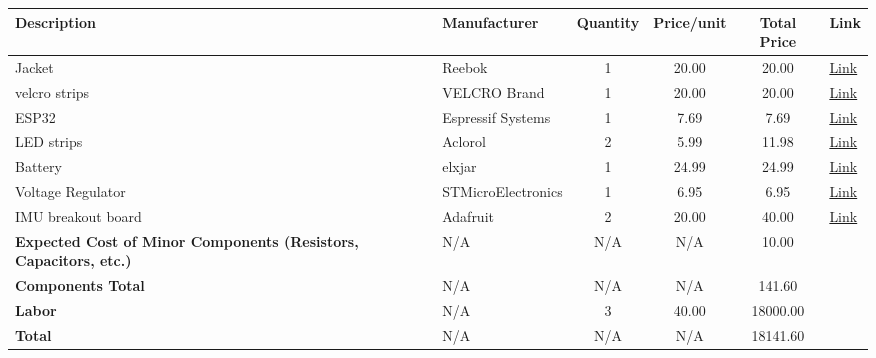 \documentclass[12pt]{article}
\begin{document}
\begin{table}[htbp]
    \centering
    \begin{tabular}{@{} l l S[table-format=1.0] S[table-format=2.2] S[table-format=5.2] l @{}}
    \toprule
    \textbf{Description} & \textbf{Manufacturer} & {\textbf{Quantity}} & {\textbf{Price/unit}} & {\textbf{Total Price}} & {\textbf{Link}} \\
    \midrule
    Jacket              & Reebok               & 1                  & 20.00               & 20.00               & \href{https://www.walmart.com/ip/Reebok-Men-s-Hooded-Sweater-Fleece-Jacket-Sizes-M-2XL/3638204782}{Link} \\
    velcro strips       & VELCRO Brand         & 1                  & 20.00               & 20.00               & \href{https://tinyurl.com/96a2mzmp}{Link} \\
    ESP32               & Espressif Systems    & 1                  & 7.69                & 7.69                & \href{https://tinyurl.com/53m9m6st}{Link} \\
    LED strips          & Aclorol              & 2                  & 5.99                & 11.98               & \href{https://tinyurl.com/bdjy37u6}{Link} \\
    Battery             & elxjar               & 1                  & 24.99               & 24.99               & \href{https://tinyurl.com/3edpx9py}{Link} \\
    Voltage Regulator   & STMicroElectronics   & 1                  & 6.95                & 6.95                & \href{https://pmdway.com/products/lm317-1-2-37v-1-5a-to-220-adjustable-linear-voltage-regulator-10-pack}{Link} \\
    IMU breakout board  & Adafruit             & 2                  & 20.00               & 40.00               & \href{https://tinyurl.com/3r7yceb9}{Link} \\
    \addlinespace
    \parbox[t]{5cm}{\textbf{Expected Cost of Minor Components (Resistors, Capacitors, etc.)}} & {N/A} & {N/A} & {N/A} & 10.00  & \\
    \addlinespace
    \textbf{Components Total} & {N/A} & {N/A} & {N/A} & 141.60 & \\
    \textbf{Labor}            & {N/A} & {3}    & {40.00} & 18000.00 & \\
    \midrule
    \textbf{Total}            & {N/A} & {N/A}  & {N/A} & 18141.60 & \\
    \bottomrule
    \end{tabular}
    \end{table}
\end{document}
